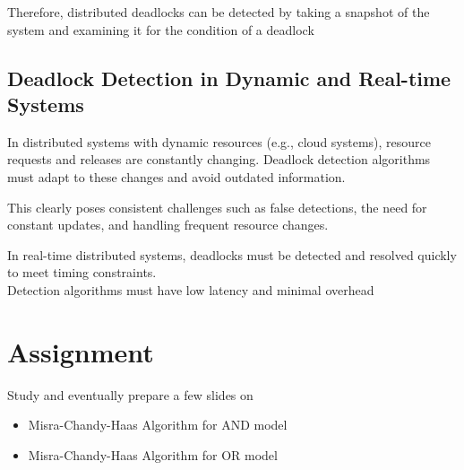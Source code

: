 Therefore, distributed deadlocks can be detected by taking
a snapshot of the system and examining it for the condition
of a deadlock



\subsection{Deadlock Detection in Dynamic and Real-time Systems}

In distributed systems with dynamic resources (e.g., cloud systems), resource requests and releases are constantly changing. Deadlock detection algorithms must adapt to these changes and avoid outdated information.

This clearly poses consistent challenges such as false detections, the need for constant
updates, and handling frequent resource changes.


In real-time distributed systems, deadlocks must be detected and resolved quickly to meet timing constraints.\\
Detection algorithms must have low latency and minimal overhead

\section{Assignment}

Study and eventually prepare a few slides on
\begin{itemize}
   \item Misra-Chandy-Haas Algorithm for AND model
   \item Misra-Chandy-Haas Algorithm for OR model
\end{itemize}